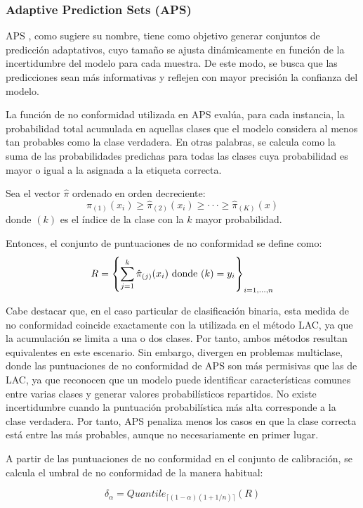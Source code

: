 \subsubsection{Adaptive Prediction Sets (APS)}

APS \cite{romano2020}, como sugiere su nombre, tiene como objetivo generar conjuntos de predicción 
adaptativos, cuyo tamaño se ajusta dinámicamente en función de la incertidumbre del modelo para cada muestra. 
De este modo, se busca que las predicciones sean más informativas y reflejen con mayor precisión la confianza 
del modelo.

La función de no conformidad utilizada en APS evalúa, para cada instancia, la probabilidad total acumulada en 
aquellas clases que el modelo considera al menos tan probables como la clase verdadera.
En otras palabras, se calcula como la suma de las probabilidades predichas para todas las clases cuya 
probabilidad es mayor o igual a la asignada a la etiqueta correcta.



Sea el vector $\hat{\pi}$ ordenado en orden decreciente: 
$$
\hat{\pi}_{(1)}(x_i) \ge \hat{\pi}_{(2)}(x_i) \ge \cdot\cdot\cdot \ge \hat{\pi}_{(K)}(x)
$$
donde $(k)$ es el índice de la clase con la $k$ mayor probabilidad.

Entonces, el conjunto de puntuaciones de no conformidad se define como:
$$
R = \left\{ \sum_{j=1}^k \hat{\pi}_{(j)}(x_i) \textnormal{ donde } (k)=y_i \right\}_{i=1,...,n}
$$

Cabe destacar que, en el caso particular de clasificación binaria, esta medida de no conformidad coincide 
exactamente con la utilizada en el método LAC, ya que la acumulación se limita a una o dos clases. Por tanto, 
ambos métodos resultan equivalentes en este escenario. Sin embargo, divergen en problemas multiclase, donde 
las puntuaciones de no conformidad de APS son más permisivas que las de LAC, ya que reconocen que un modelo 
puede identificar características comunes entre varias clases y generar valores probabilísticos repartidos.
No existe incertidumbre cuando la puntuación probabilística más alta corresponde a la clase verdadera. 
Por tanto, APS penaliza menos los casos en que la clase correcta está entre las más probables, aunque no 
necesariamente en primer lugar.

A partir de las puntuaciones de no conformidad en el conjunto de calibración, se calcula el umbral de no 
conformidad de la manera habitual:

$$
\delta_\alpha = Quantile_{ \lceil  (1-\alpha) (1 + 1/n)  \rceil } ( R )
$$

